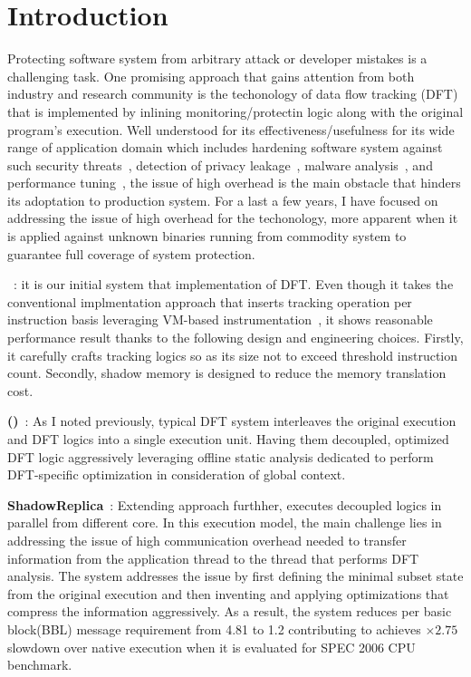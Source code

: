 \section{Introduction} \label{sec:intro}

Protecting software system from arbitrary attack or developer mistakes is a
challenging task.
%
One promising approach that gains attention from both industry and research
community is the techonology of data flow tracking (DFT) that is implemented by
inlining monitoring/protectin logic along with the original program's
execution.
%
Well understood for its effectiveness/usefulness for its wide range of
application domain which includes hardening software system against such
security threats~\cite{x}, detection of privacy leakage~\cite{x}, malware
analysis~\cite{x}, and performance tuning~\cite{x}, the issue of high overhead
is the main obstacle that hinders its adoptation to production system.
%
For a last a few years, I have focused on addressing the issue of high overhead
for the techonology, more apparent when it is applied against unknown binaries
running from commodity system to guarantee full coverage of system protection.

%
%
{\bf \libdft}~\cite{libdft}: it is our initial system that implementation of
DFT. Even though it takes the conventional implmentation approach that inserts
tracking operation per instruction basis leveraging VM-based
instrumentation~\cite{pin}, it shows reasonable performance result thanks to
the following design and engineering choices. Firstly, it carefully crafts
tracking logics so as its size not to exceed threshold instruction count.
Secondly, shadow memory is designed to reduce the memory translation cost.

{\bf \tfafull (\tfa)}~\cite{tfa}: As I noted previously, typical DFT system
interleaves the original execution and DFT logics into a single execution unit.
Having them decoupled, \tfa optimized DFT logic aggressively leveraging offline
static analysis dedicated to perform DFT-specific optimization in consideration
of global context.

{\bf ShadowReplica}~\cite{sreplica}: Extending \tfa approach furthher,
\sreplica executes decoupled logics in parallel from different core. In this
execution model, the main challenge lies in addressing the issue of high
communication overhead needed to transfer information from the application
thread to the thread that performs DFT analysis. The system addresses the issue
by first defining the minimal subset state from the original execution and then
inventing and applying optimizations that compress the information
aggressively. As a result, the system reduces per basic block(BBL) message
requirement from 4.81 to 1.2 contributing to achieves $\times 2.75$ slowdown
over native execution when it is evaluated for SPEC 2006 CPU benchmark. 

